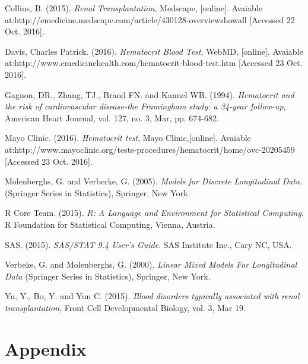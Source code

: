 \documentclass[11pt]{article}
\begin{document}
\begin{thebibliography}{99}

 Collins, B. (2015). \textit{Renal Transplantation}, Medscape, [online]. Avaiable at:http://emedicine.medscape.com/article/430128-overviewshowall [Accessed 22 Oct. 2016].

 Davis, Charles Patrick. (2016). \textit{Hematocrit Blood Test}, WebMD, [online]. Avaiable at:http://www.emedicinehealth.com/hematocrit-blood-test.htm [Accessed 23 Oct. 2016].

 Gagnon, DR., Zhang, TJ., Brand FN. and Kannel WB. (1994). \textit{Hematocrit and the risk of cardiovascular disease-the Framingham study: a 34-year follow-up}, American Heart Journal, vol. 127, no. 3, Mar, pp. 674-682.

 Mayo Clinic. (2016). \textit{Hematocrit test}, Mayo Clinic,[online]. Avaiable at:http://www.mayoclinic.org/tests-procedures/hematocrit/home/ovc-20205459 [Accessed 23 Oct. 2016].

 Molenberghs, G. and  Verberke, G. (2005). \textit{Models for Discrete Longitudinal Data}. (Springer Series in Statistics), Springer, New York.

 R Core Team. (2015). \textit{R: A Language and Environment for Statistical Computing}. R Foundation for Statistical Computing, Vienna, Austria. 

 SAS. (2015). \textit{SAS/STAT 9.4 User's Guide}. SAS Institute Inc., Cary NC, USA.

 Verbeke, G. and Molenberghs, G. (2000). \textit{Linear Mixed Models For Longitudinal Data} (Springer Series in Statistics), Springer, New York.

 Yu, Y.,  Bo, Y. and Yun C. (2015). \textit{Blood disorders typically associated with renal transplantation}, Front Cell Developmental Biology, vol. 3, Mar 19.
\end{thebibliography}

\section*{Appendix}
\end{document}
